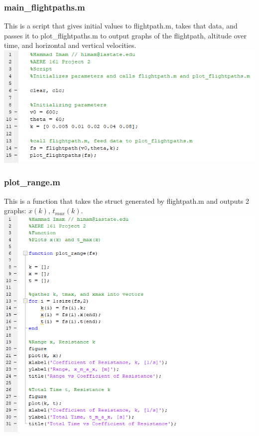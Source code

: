 \documentclass[oneside]{article}
\begin{document}
\subsubsection{main\_flightpaths.m}
This is a script that gives initial values to flightpath.m, takes that data, and passes it to plot\_flightpaths.m to output graphs of the flightpath, altitude over time, and horizontal and vertical velocities.\\
\includegraphics [width=\linewidth]{code_main_flightpaths.png}
\newpage
\subsubsection{plot\_range.m}
This is a function that takes the struct generated by flightpath.m and outputs 2 graphs: $x(k)$, $t_{max}(k)$.\\
\includegraphics [width=\linewidth]{code_plot_range.png}
\newpage
\end{document}
